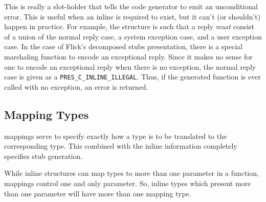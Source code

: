 This is really a slot-holder that tells the code generator to emit an
unconditional error.  This is useful when an inline is required to exist, but
it can't (or shouldn't) happen in practice.  For example, the \PRESC{}
structure is such that a reply \emph{must} consist of a union of the normal
reply case, a system exception case, and a user exception case.  In the case of
Flick's decomposed stubs presentation, there is a special marshaling function
to encode an exceptional reply.  Since it makes no sense for one to encode an
exceptional reply when there is no exception, the normal reply case is given as
a \texttt{PRES\_C\_INLINE\_ILLEGAL}.  Thus, if the generated function is ever
called with no exception, an error is returned.



\subsection{Mapping Types}
\label{subsec:PRESC:Mapping Types}

\PRESC{} mappings serve to specify exactly how a \MINT{} type is to be
translated to the corresponding \CAST{} type.  This combined with the inline
information completely specifies stub generation.

While inline structures can map \MINT{} types to more than one parameter in a
function, mappings control one and only parameter.  So, inline types which
present more than one parameter will have more than one mapping type.

